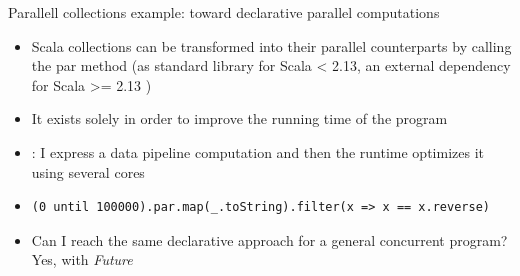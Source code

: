 \documentclass[presentation, 9pt]{beamer}\mode<presentation>{\usetheme{AMSBolognaFC}}
\begin{document}
\begin{frame}[fragile]{Parallell collections example: toward declarative parallel computations}
	\begin{itemize}
		\item Scala collections can be transformed into their parallel counterparts by calling the par
		method (as standard library for Scala < 2.13, an external dependency for Scala >= 2.13 \href{https://github.com/scala/scala-parallel-collections}{\faLink})
		\item It exists solely in order to improve the running time of the program
  	\item {}: I express a data pipeline computation and then the runtime optimizes it using several cores
		\item[] \begin{tcolorbox}[left=0pt, top=0pt, bottom=0pt]
			\begin{verbatim}
(0 until 100000).par.map(_.toString).filter(x => x == x.reverse)
			\end{verbatim}
		\end{tcolorbox}
		\item Can I reach the same declarative approach for a general concurrent program? Yes, with \emph{Future} 
	\end{itemize}
\end{frame}
\end{document}
